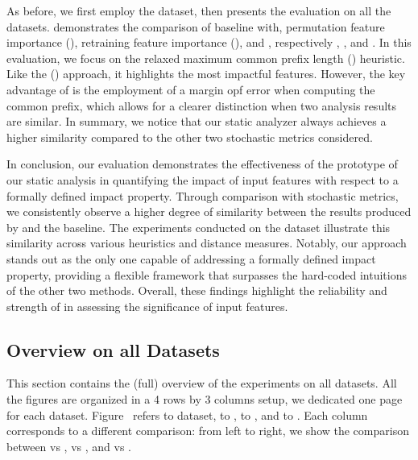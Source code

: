 As before, we first employ the \diabetes{} dataset, then  presents the evaluation on all the datasets.
 demonstrates the comparison of baseline with, permutation feature importance (\pfi), retraining feature importance (\rfe), and \impatto, respectively , , and .
In this evaluation, we focus on the relaxed maximum common prefix length (\rmcpl) heuristic.
Like the (\mcpl) approach, it highlights the most impactful features.
However, the key advantage of \rmcpl{} is the employment of a margin opf error when computing the common prefix, which allows for a clearer distinction when two analysis results are similar.
In summary, we notice that our static analyzer \impatto{} always achieves a higher similarity compared to the other two stochastic metrics considered.


In conclusion, our evaluation demonstrates the effectiveness of the prototype of our static analysis in quantifying the impact of input features with respect to a formally defined impact property.
Through comparison with stochastic metrics, we consistently observe a higher degree of similarity between the results produced by \impatto{} and the baseline.
The experiments conducted on the \diabetes{} dataset illustrate this similarity across various heuristics and distance measures.
Notably, our approach stands out as the only one capable of addressing a formally defined impact property, providing a flexible framework that surpasses the hard-coded intuitions of the other two methods.
Overall, these findings highlight the reliability and strength of \impatto{} in assessing the significance of input features.

\subsection{Overview on all Datasets}

This section contains the (full) overview of the experiments on all datasets.
All the figures are organized in a 4 rows by 3 columns setup, we dedicated one page for each dataset.
Figure~ refers to \diabetes{} dataset,  to \wine,  to \rain, and  to \princess.
Each column corresponds to a different comparison: from left to right, we show the comparison between \impatto{} vs \pfi, \impatto{} vs \rfe, and \pfi{} vs \rfe.

